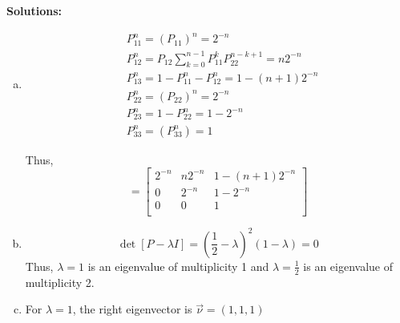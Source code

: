 \documentclass{article}
\begin{document}
    \textbf{Solutions:}
    \begin{enumerate}[(a)]
        \item 
        \begin{equation*}
            \begin{aligned}
                &P^n_{11} = (P_{11})^n=2^{-n}\\
                &P^n_{12} = P_{12}\sum_{k=0}^{n-1}P^k_{11}P_{22}^{n-k+1} =n2^{-n}\\
                &P^n_{13} = 1 - P_{11}^n-P^n_{12} = 1-(n+1)2^{-n}\\
                &P^n_{22} = (P_22)^n=2^{-n}\\
                &P^n_{23} = 1- P^n_{22} = 1-2^{-n}\\
                &P^n_{33} = (P_{33}^n)=1
            \end{aligned}
        \end{equation*}

        Thus,
        \begin{equation*}
            [P^n]=\begin{bmatrix}
                2^{-n} & n2^{-n} & 1-(n+1)2^{-n}\\
                0 & 2^{-n} & 1-2^{-n}\\
                0 & 0 & 1\\
            \end{bmatrix}
        \end{equation*}
        \item 
        \begin{equation*}
            \det[P-\lambda I]=(\frac{1}{2}-\lambda)^2(1-\lambda) = 0
        \end{equation*}
        Thus, $\lambda=1$ is an eigenvalue of multiplicity 1 and $\lambda=\frac{1}{2}$ is an eigenvalue of multiplicity 2.

        \item
        For $\lambda=1$, the right eigenvector is $\vec{\nu}=(1, 1, 1)$


\end{enumerate}
\end{document}
